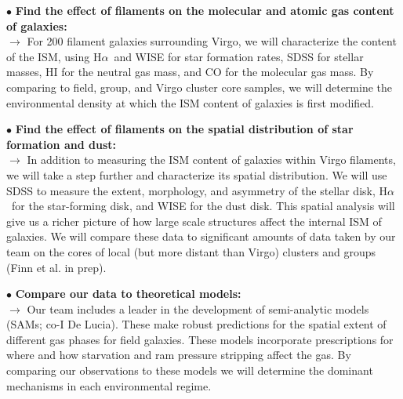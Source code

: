 \documentclass[11pt, preprint]{aastex}
\newcommand{\ha}{H$\alpha$}
\begin{document}
\noindent $\bullet$ \textbf{Find the effect of filaments on the molecular and atomic gas content of galaxies:}\\ $\rightarrow$ 
For 200 filament galaxies surrounding Virgo, we will characterize the
content of the ISM, using \ha\ and WISE for star formation rates,
SDSS for stellar masses, HI for the neutral gas mass, and CO for the
molecular gas mass. By comparing to field, group, and Virgo cluster
core samples, we will determine the environmental density at which the
ISM content of galaxies is first modified.
%
  
\noindent $\bullet$ \textbf{Find the effect of filaments
  on the spatial distribution of star formation and
  dust:}\\ $\rightarrow$
In addition to measuring the ISM content of galaxies within Virgo filaments, we will take a step further and characterize its spatial distribution. We will use SDSS to measure the extent, morphology, and asymmetry of the stellar disk, \ha\ for the star-forming disk, and WISE for the dust disk. This spatial analysis will give us a richer picture of how large scale structures affect the internal ISM of galaxies. We will compare these data to significant amounts of data taken by our team on the cores of local (but more distant than Virgo) clusters and groups (Finn et al. in prep). 
  
\noindent $\bullet$ \textbf{Compare our data to theoretical models:}\\
$\rightarrow$ 
Our team includes a leader in the development of semi-analytic models (SAMs; co-I De Lucia).  These make robust predictions for
the spatial extent of different gas phases for field galaxies. These
models incorporate prescriptions for where and how starvation and ram
pressure stripping affect the gas. By comparing our observations to
these models we will  determine the  dominant mechanisms in each environmental regime. 
\end{document}
